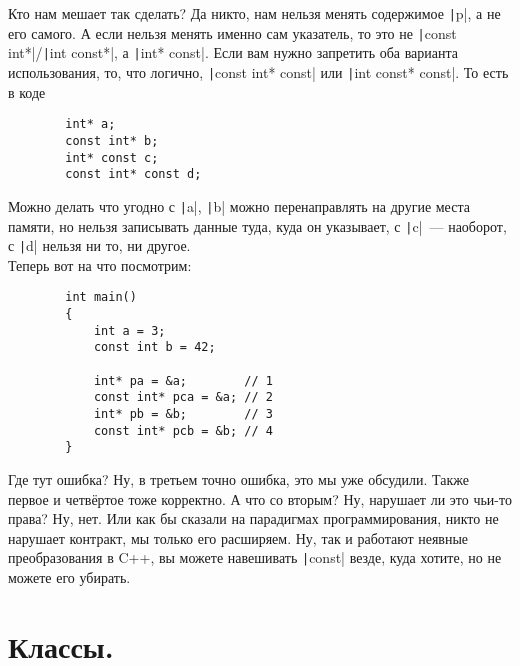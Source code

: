 \documentclass{article}
\begin{document}
    Кто нам мешает так сделать? Да никто, нам нельзя менять содержимое \texttt|p|, а не его самого. А если нельзя менять именно сам указатель, то это не \texttt|const int*|/\texttt|int const*|, а \texttt|int* const|. Если вам нужно запретить оба варианта использования, то, что логично, \texttt|const int* const| или \texttt|int const* const|. То есть в коде
    \begin{verbatim}
        int* a;
        const int* b;
        int* const c;
        const int* const d;
    \end{verbatim}
    Можно делать что угодно с \texttt|a|, \texttt|b| можно перенаправлять на другие места памяти, но нельзя записывать данные туда, куда он указывает, с \texttt|c|~--- наоборот, с \texttt|d| нельзя ни то, ни другое.\\
    Теперь вот на что посмотрим:
    \begin{verbatim}
        int main()
        {
            int a = 3;
            const int b = 42;

            int* pa = &a;        // 1
            const int* pca = &a; // 2
            int* pb = &b;        // 3
            const int* pcb = &b; // 4
        }
    \end{verbatim}
    Где тут ошибка? Ну, в третьем точно ошибка, это мы уже обсудили. Также первое и четвёртое тоже корректно. А что со вторым? Ну, нарушает ли это чьи-то права? Ну, нет. Или как бы сказали на парадигмах программирования, никто не нарушает контракт, мы только его расширяем. Ну, так и работают неявные преобразования в C++, вы можете навешивать \texttt|const| везде, куда хотите, но не можете его убирать.
    \section{Классы.}
\end{document}
